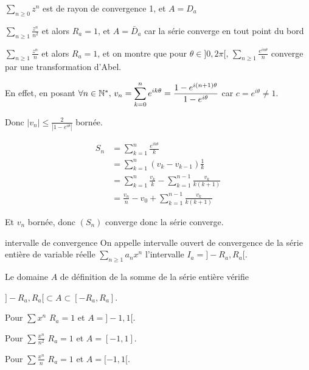 \begin{exemple}
    $\sum_{n \geqslant 0} z^n$ est de rayon de convergence 1, et $A = D_a$

    \lvspace $\sum_{n \geqslant 1} \frac{z^n }{n^2 }$ et alors $R_a = 1$, et $A = \bar D_a$ car la série converge en tout point du bord

    \lvspace $\sum_{n \geqslant 1} \frac{z^n }{n }$ et alors $R_a = 1$, et on montre que pour 
    $\theta \in ]0, 2 \pi[, \, \sum_{n \geqslant 1} \frac{e^{i n \theta}}{n}$ converge par une transformation d'Abel.

    En effet, en posant $\forall n \in \mathbb{N}^*, \, v_n = \displaystyle \sum_{k = 0 }^{n } e^{i k \theta} = \frac{1 - e^{i (n + 1) \theta}}{1 - e^{i \theta}}$
    car $c = e^{i \theta} \neq 1$. 
    
    Donc $\displaystyle \left| v_n \right| \leqslant \frac 2 {\left| 1 - e ^{i \theta} \right|}$ bornée.

    \begin{align}
        S_n & = \sum_{k = 1}^n \frac{e^{i k \theta}}{k} \\
        & = \sum_{k = 1}^n \left( v_k - v_{k - 1} \right) \frac 1 k \\
        & = \sum_{k = 1}^{n} \frac{v_k} k - \sum_{k = 1}^{n - 1} \frac{v_k}{k(k + 1)}\\
        & = \frac{v_n} n - v_0 + \sum_{k = 1}^{n - 1} \frac{v_k}{k(k + 1)} 
    \end{align}

    Et $v_n$ bornée, donc $(S_n)$ converge donc la série converge. 
\end{exemple}

\begin{definition}{intervalle de convergence}{}
    On appelle intervalle ouvert de convergence de la série entière de variable 
    réelle $\sum_{n \geqslant 1} a_n x^n$ l'intervalle $I_a = ]-R_a, R_a[$.

    Le domaine $A$ de définition de la somme de la série entière vérifie 
    
    $] - R_a, R_a [ \subset A \subset [ - R_a, R_a ]$.
\end{definition}

\begin{exemple}
    Pour $\displaystyle \sum x^n$ $R_a = 1$ et $A = ]-1, 1[$.

    \lvspace Pour $\displaystyle \sum \frac{x^n}{n^2}$ $R_a = 1$ et $A = [ -1, 1 ]$.

    \lvspace Pour $\displaystyle \sum \frac{x^n}{n}$ $R_a = 1$ et $A = [ -1, 1 [ $.
\end{exemple}

